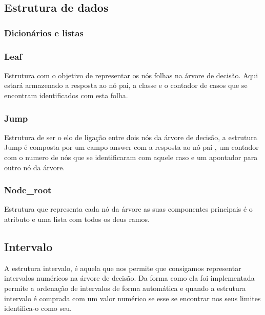 \documentclass[12pt,a4paper]{article}
\begin{document}
\subsection{Estrutura de dados}

\subsubsection{Dicionários e listas}


\subsubsection{Leaf}
Estrutura com o objetivo de representar os nós folhas na árvore de decisão. Aqui estará armazenado a resposta ao nó pai, a classe e o contador de casos que se encontram identificados com esta folha.
\subsubsection{Jump}
Estrutura de ser o elo de ligação entre dois nós da árvore  de decisão, a estrutura Jump é composta por um campo answer com a resposta ao nó pai , um contador com o numero de nós que se identificaram com aquele caso e um apontador para outro nó da árvore.
\subsubsection{Node\_root}
Estrutura que representa cada nó da árvore as suas componentes principais é o atributo e uma lista com todos os deus ramos.

\subsection{Intervalo}
A estrutura intervalo, é aquela que nos permite que consigamos representar intervalos numéricos na árvore de decisão. Da forma como ela foi implementada permite a ordenação de intervalos de forma automática e quando a estrutura intervalo é comprada com um valor numérico se esse se encontrar nos seus limites identifica-o como seu.
\end{document}
